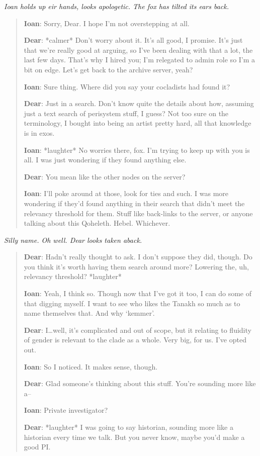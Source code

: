 \emph{Ioan holds up eir hands, looks apologetic. The fox has tilted its ears back.}

\begin{quote}
\textbf{Ioan}: Sorry, Dear. I hope I'm not overstepping at all.

\textbf{Dear}: *calmer* Don't worry about it. It's all good, I promise. It's just that we're really good at arguing, so I've been dealing with that a lot, the last few days. That's why I hired you; I'm relegated to admin role so I'm a bit on edge. Let's get back to the archive server, yeah?

\textbf{Ioan}: Sure thing. Where did you say your cocladists had found it?

\textbf{Dear}: Just in a search. Don't know quite the details about how, assuming just a text search of perisystem stuff, I guess? Not too sure on the terminology, I bought into being an artist pretty hard, all that knowledge is in exos.

\textbf{Ioan}: *laughter* No worries there, fox. I'm trying to keep up with you is all. I was just wondering if they found anything else.

\textbf{Dear}: You mean like the other nodes on the server?

\textbf{Ioan}: I'll poke around at those, look for ties and such. I was more wondering if they'd found anything in their search that didn't meet the relevancy threshold for them. Stuff like back-links to the server, or anyone talking about this Qoheleth. Hebel. Whichever.
\end{quote}

\emph{Silly name. Oh well. Dear looks taken aback.}

\begin{quote}
\textbf{Dear}: Hadn't really thought to ask. I don't suppose they did, though. Do you think it's worth having them search around more? Lowering the, uh, relevancy threshold? *laughter*

\textbf{Ioan}: Yeah, I think so. Though now that I've got it too, I can do some of that digging myself. I want to see who likes the Tanakh so much as to name themselves that. And why `kemmer'.

\textbf{Dear}: I\ldots{}well, it's complicated and out of scope, but it relating to fluidity of gender is relevant to the clade as a whole. Very big, for us. I've opted out.

\textbf{Ioan}: So I noticed. It makes sense, though.

\textbf{Dear}: Glad someone's thinking about this stuff. You're sounding more like a--

\textbf{Ioan}: Private investigator?

\textbf{Dear}: *laughter* I was going to say historian, sounding more like a historian every time we talk. But you never know, maybe you'd make a good PI.
\end{quote}

